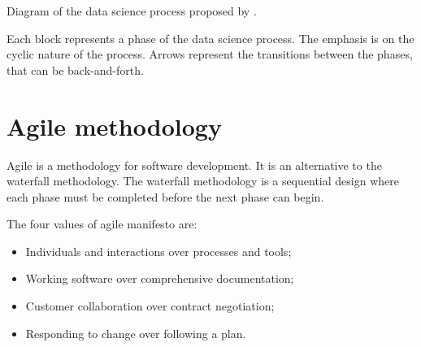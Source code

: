 \begin{figurebox}[label=fig:zumel]{Diagram of the data science process proposed by \textcite{Zumel2019}.}
  \centering

  \tcblower
  Each block represents a phase of the data science process.  The emphasis is on the
  cyclic nature of the process.  Arrows represent the transitions between the phases, that
  can be back-and-forth.
\end{figurebox}

\section{Agile methodology}

Agile is a methodology for software development.  It is an alternative to the waterfall
methodology.  The waterfall methodology is a sequential design where each phase
must be completed before the next phase can begin.

The four values of agile manifesto are:
\begin{itemize}
  \itemsep0em
  \item Individuals and interactions over processes and tools;
  \item Working software over comprehensive documentation;
  \item Customer collaboration over contract negotiation;
  \item Responding to change over following a plan.
\end{itemize}

